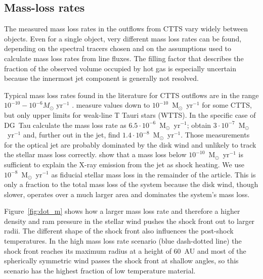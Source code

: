 \subsection{Mass-loss rates}
\label{sect:masslossrates}
The measured mass loss rates in the outflows from CTTS vary widely between objects.  Even for a single object, very different mass loss rates can be found, depending on the spectral tracers chosen and on the assumptions used to calculate mass loss rates from line fluxes. The filling factor that describes the fraction of the observed volume occupied by hot gas is especially uncertain because the innermost jet component is generally not resolved.

Typical mass loss rates found in the literature for CTTS outflows are in the range $10^{-10}-10^{-6}M_{\odot}\textrm{ yr}^{-1}$ \citep{1999A&A...342..717B,2006A&A...456..189P}. \citet{2006ApJ...646..319E} measure values down to $10^{-10}$~M$_{\odot}$~yr$^{-1}$ for some CTTS, but only upper limits for weak-line T Tauri stars (WTTS). In the specific case of DG~Tau \citet{1997A&A...327..671L} calculate the  mass loss rate as $6.5\cdot 10^{-6}$~M$_{\odot}$~yr$^{-1}$; \citet{1995ApJ...452..736H}
obtain $3\cdot 10^{-7}$~M$_{\odot}$~yr$^{-1}$ and, further out in the jet, \citet{2000A&A...356L..41L} find $1.4\cdot 10^{-8}$~M$_{\odot}$~yr$^{-1}$. Those measurements for the optical jet are probably dominated by the disk wind \citep[e.g.][]{2014arXiv1404.0728W} and unlikely to track the stellar mass loss correctly.
\citet{2009A&A...493..579G} show that a mass loss below $10^{-10}$~M$_{\odot}$~yr$^{-1}$ is sufficient to explain the X-ray emission from the jet as shock heating.
We use $10^{-8}$~M$_{\odot}$~yr$^{-1}$ as fiducial stellar mass loss in the remainder of the article. This is only a fraction to the total mass loss of the system because the disk wind, though slower, operates over a much larger area and dominates the system's mass loss.

Figure~\ref{fig:dot_m} shows how a larger mass loss rate and therefore a higher density and ram pressure in the stellar wind pushes the shock front out to larger radii. The different shape of the shock front also influences the post-shock temperatures. In the high mass loss rate scenario (blue dash-dotted line) the shock front reaches its maximum radius at a height of 60~AU and most of the spherically symmetric wind passes the shock front at shallow angles, so this scenario has the highest fraction of low temperature material.
